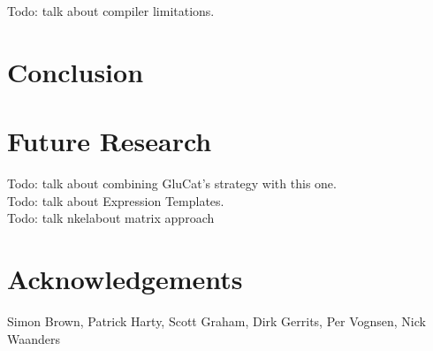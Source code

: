 \documentclass[10pt]{article}
\begin{document}
Todo: talk about compiler limitations.

\section{Conclusion}

\section{Future Research}

Todo: talk about combining GluCat's strategy with this one.\\
Todo: talk about Expression Templates. \\
Todo: talk nkelabout matrix approach

\section{Acknowledgements}

Simon Brown, Patrick Harty, Scott Graham, Dirk Gerrits, Per Vognsen, Nick
Waanders
\end{document}
